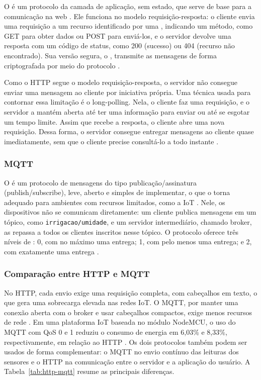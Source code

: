 O  é um protocolo da camada de aplicação, sem estado, que serve de base para a comunicação na web \cite{rfc9110}. Ele funciona no modelo requisição-resposta: o cliente envia uma requisição a um recurso identificado por uma , indicando um método, como GET para obter dados ou POST para enviá-los, e o servidor devolve uma resposta com um código de status, como 200 (sucesso) ou 404 (recurso não encontrado). Sua versão segura, o , transmite as mensagens de forma criptografada por meio do protocolo  \cite{rfc9110}.

Como o HTTP segue o modelo requisição-resposta, o servidor não consegue enviar uma mensagem ao cliente por iniciativa própria. Uma técnica usada para contornar essa limitação é o long-polling. Nela, o cliente faz uma requisição, e o servidor a mantém aberta até ter uma informação para enviar ou até se esgotar um tempo limite. Assim que recebe a resposta, o cliente abre uma nova requisição. Dessa forma, o servidor consegue entregar mensagens ao cliente quase imediatamente, sem que o cliente precise consultá-lo a todo instante \cite{rfc6202}.
 
\subsubsection{MQTT}
 
O  é um protocolo de mensagens do tipo publicação/assinatura (publish/subscribe), leve, aberto e simples de implementar, o que o torna adequado para ambientes com recursos limitados, como a IoT \cite{mqtt5}. Nele, os dispositivos não se comunicam diretamente: um cliente publica mensagens em um tópico, como \texttt{irrigacao/umidade}, e um servidor intermediário, chamado broker, as repassa a todos os clientes inscritos nesse tópico. O protocolo oferece três níveis de : 0, com no máximo uma entrega; 1, com pelo menos uma entrega; e 2, com exatamente uma entrega \cite{mqtt5}. 

\subsubsection{Comparação entre HTTP e MQTT}
 
No HTTP, cada envio exige uma requisição completa, com cabeçalhos em texto, o que gera uma sobrecarga elevada nas redes IoT. O MQTT, por manter uma conexão aberta com o broker e usar cabeçalhos compactos, exige menos recursos de rede \cite{yokotani2016}. Em uma plataforma IoT baseada no módulo NodeMCU, o uso do MQTT com QoS 0 e 1 reduziu o consumo de energia em 6,03\% e 8,33\%, respectivamente, em relação ao HTTP \cite{jaraochoa2023}. Os dois protocolos também podem ser usados de forma complementar: o MQTT no envio contínuo das leituras dos sensores e o HTTP na comunicação entre o servidor e a aplicação do usuário. A Tabela~\ref{tab:http-mqtt} resume as principais diferenças.

